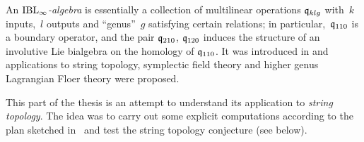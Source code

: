 \documentclass[\MainFolder/Text.tex]{subfiles}
\begin{document}
An \emph{$\mathrm{IBL}_\infty$-algebra} is essentially a collection of multilinear operations $\mathfrak{q}_{klg}$ with~$k$ inputs,~$l$ outputs and ``genus''~$g$ satisfying certain relations; in particular,~$\mathfrak{q}_{110}$ is a boundary operator, and the pair $\mathfrak{q}_{210}$, $\mathfrak{q}_{120}$ induces the structure of an involutive Lie bialgebra on the homology of $\mathfrak{q}_{110}$.
It was introduced in \cite{Cieliebak2015} and applications to string topology, symplectic field theory and higher genus Lagrangian Floer theory were proposed.

This part of the thesis is an attempt to understand its application to \emph{string topology}.
The idea was to carry out some explicit computations according to the plan sketched in~\cite[Section~13]{Cieliebak2015} and test the string topology conjecture (see below).

\end{document}

